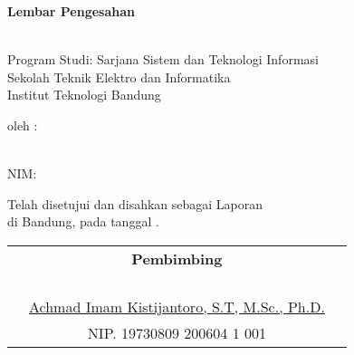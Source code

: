 \clearpage
\pagestyle{empty}

\begin{center}
    \smallskip

    {\Large \bfseries Lembar Pengesahan}

    \MakeUppercase{\normalsize \bfseries \thetitle}
    \vfill

    \normalsize \jenislaporan \\
    Program Studi: Sarjana Sistem dan Teknologi Informasi \\
    Sekolah Teknik Elektro dan Informatika \\
    Institut Teknologi Bandung \\
    \vfill

    \normalsize oleh :

    \normalsize \theauthor \\
    \normalsize NIM: \nim

    \vfill
    \normalsize \normalfont
    Telah disetujui dan disahkan sebagai Laporan \jenislaporan \\
    di Bandung, pada tanggal \thedate{} \yearsidang{}.

    \vfill
    \setlength{\tabcolsep}{12pt}
    \begin{tabularx}{\textwidth}{c@{\hskip 0.2\textwidth}cc@{\hskip 0.3\textwidth}}
         & {\bfseries Pembimbing}                                  & \\
         &                                                         & \\
         &                                                         & \\
         &                                                         & \\
         &                                                         & \\
         & \underline{Achmad Imam Kistijantoro, S.T, M.Sc., Ph.D.} & \\
         & NIP. 19730809 200604 1 001                              &
    \end{tabularx}

\end{center}
\clearpage
